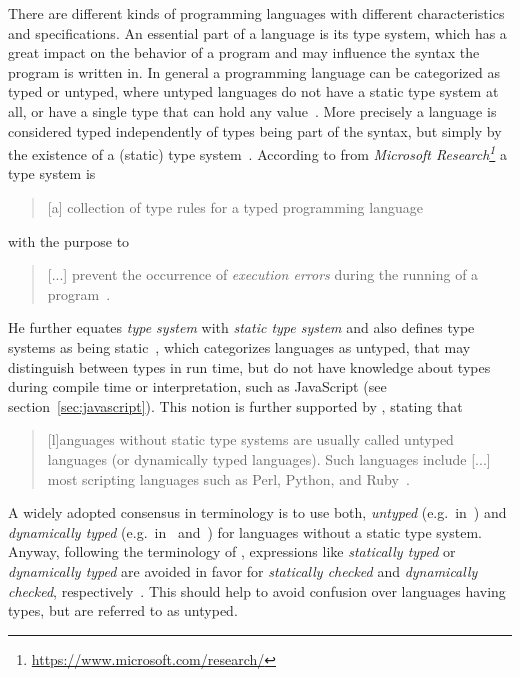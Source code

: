 There are different kinds of programming languages with different characteristics and specifications. An essential part of a language is its type system, which has a great impact on the behavior of a program and may influence the syntax the program is written in.
In general a programming language can be categorized as typed or untyped, where untyped languages do not have a static type system at all, or have a single type that can hold any value~\cite[p.~2]{TypeSystems:Cardelli:2004}. More precisely a language is considered typed independently of types being part of the syntax, but simply by the existence of a (static) type system~\cite[p.~2]{TypeSystems:Cardelli:2004}.
According to \citeauthor{TypeSystems:Cardelli:2004} from \emph{Microsoft Research\footnote{\url{https://www.microsoft.com/research/}}} a type system is
\begin{quote}
  [a] collection of type rules for a typed programming language~\cite[p.~38]{TypeSystems:Cardelli:2004}
\end{quote}
with the purpose to
\begin{quote}
  [...] prevent the occurrence of \emph{execution errors} during the running of a program~\cite[p.~1]{TypeSystems:Cardelli:2004}.
\end{quote}
He further equates \emph{type system} with \emph{static type system} and also \citeauthor{TypesAndProgrammingLanguages:Pierce:2002} defines type systems as being static~\cite[p.~2]{TypesAndProgrammingLanguages:Pierce:2002}, which categorizes languages as untyped, that may distinguish between types in run time, but do not have knowledge about types during compile time or interpretation, such as JavaScript (see section~\ref{sec:javascript}). This notion is further supported by \citeauthor{ProgrammingLanguagesPrinciplesAndPractices:LoudenLambert:2011}, stating that
\begin{quote}
  [l]anguages without static type systems are usually called untyped languages (or dynamically typed languages). Such languages include [...] most scripting languages such as Perl, Python, and Ruby~\cite[p.~331]{ProgrammingLanguagesPrinciplesAndPractices:LoudenLambert:2011}.
\end{quote}
A widely adopted consensus in terminology is to use both, \emph{untyped} (e.g.\ in~\cite[p.~117]{LogicalTypesForUntypedLanguages:Tobin-Hochstadt:2010}) and \emph{dynamically typed} (e.g.\ in~\cite[p.~32]{TowardsAProgramLogicForJavaScript:Gardner:2012} and~\cite[p.~203]{TypeSystemsDirectedProgrammingLanguageEvolution:Nino:2012}) for languages without a static type system. Anyway, following the terminology of \citeauthor{TypeSystems:Cardelli:2004}, expressions like \emph{statically typed} or \emph{dynamically typed} are avoided in favor for \emph{statically checked} and \emph{dynamically checked}, respectively~\cite[p.~1]{TypeSystems:Cardelli:2004}. This should help to avoid confusion over languages having types, but are referred to as untyped.

